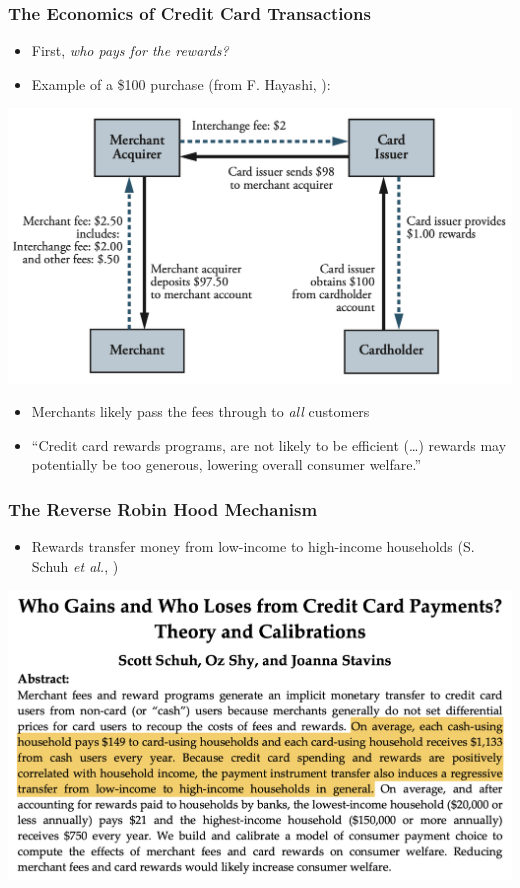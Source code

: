 \begin{frame}
    \frametitle{The Economics of Credit Card Transactions}
    \begin{itemize}
        \item<+-> First, \emph{who pays for the rewards?}
        \item Example of a \$100 purchase (from F. Hayashi, \citeyear{hayashi:2009}):
    \end{itemize}
    \begin{center}
        \includegraphics[width=.75\textwidth]{../Misc/Hayashi2009_Fig1.png}
    \end{center}    
    \begin{itemize}
        \item<+-> Merchants likely pass the fees through to \emph{all} customers
        \item<+-> ``Credit card rewards programs, are not likely to be efficient (\ldots) rewards may potentially be too generous,
        lowering overall consumer welfare.''
    \end{itemize}
\end{frame}

\begin{frame}
    \frametitle{The Reverse Robin Hood Mechanism}
    \begin{itemize}
        \item Rewards transfer money from low-income to high-income households (S. Schuh \emph{et al.}, \citeyearpar{schuetal:2010})
    \end{itemize}
    \begin{center}
        \includegraphics[width=\textwidth]{../Misc/Schuh2010.png}
    \end{center}    
\end{frame}

